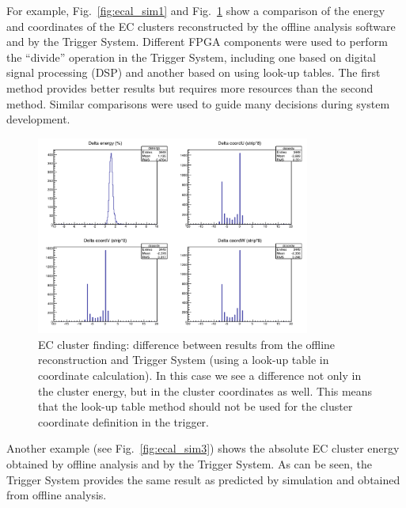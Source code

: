 For example, Fig.~\ref{fig:ecal_sim1} and Fig.~\ref{fig:ecal_sim2} show a comparison of the energy and
coordinates of the EC clusters reconstructed by the offline analysis software and by the Trigger System.
Different FPGA components were used to perform the ``divide'' operation in the Trigger System, including one
based on digital signal processing (DSP) and another based on using look-up tables. The first method provides
better results but requires more resources than the second method. Similar comparisons were used to guide
many decisions during system development.

\begin{figure}[htp]
	\begin{center}
		\centering
		\includegraphics[width=9.0cm]{img/ecal_sim2.png}
		\caption{EC cluster finding: difference between results from the offline reconstruction and Trigger
                  System (using a look-up table in coordinate calculation). In this case we see a difference not only in the
                  cluster energy, but in the cluster coordinates as well. This means that the look-up table method should
                  not be used for the cluster coordinate definition in the trigger.}
		\label{fig:ecal_sim2}
	\end{center}
\end{figure} 

Another example (see Fig.~\ref{fig:ecal_sim3}) shows the absolute EC cluster energy obtained by offline
analysis and by the Trigger System. As can be seen, the Trigger System provides the same result as predicted
by simulation and obtained from offline analysis.


